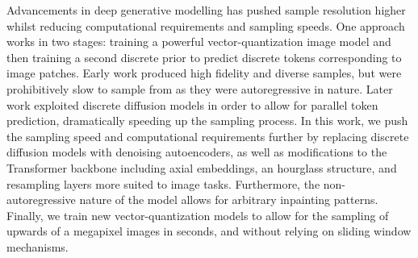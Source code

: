 Advancements in deep generative modelling has pushed sample resolution higher
whilst reducing computational requirements and sampling speeds. One approach
works in two stages: training a powerful vector-quantization image model and
then training a second discrete prior to predict discrete tokens corresponding
to image patches. Early work produced high fidelity and diverse samples, but
were prohibitively slow to sample from as they were autoregressive in nature.
Later work exploited discrete diffusion models in order to allow for parallel
token prediction, dramatically speeding up the sampling process. In this work,
we push the sampling speed and computational requirements further by replacing
discrete diffusion models with denoising autoencoders, as well as modifications
to the Transformer backbone including axial embeddings, an hourglass structure,
and resampling layers more suited to image tasks. Furthermore, the
non-autoregressive nature of the model allows for arbitrary inpainting patterns.
Finally, we train new vector-quantization models to allow for the sampling of
upwards of a megapixel images in seconds, and without relying on sliding window
mechanisms.

